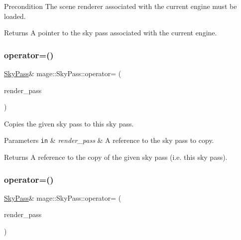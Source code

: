\begin{DoxyPrecond}{Precondition}
The scene renderer associated with the current engine must be loaded. 
\end{DoxyPrecond}
\begin{DoxyReturn}{Returns}
A pointer to the sky pass associated with the current engine. 
\end{DoxyReturn}
\hypertarget{classmage_1_1_sky_pass_acfb9531772b437603825e43d17f4d983}{}\label{classmage_1_1_sky_pass_acfb9531772b437603825e43d17f4d983} 
\subsubsection{\texorpdfstring{operator=()}{operator=()}\hspace{0.1cm}{\footnotesize\ttfamily [1/2]}}
{\footnotesize\ttfamily \hyperlink{classmage_1_1_sky_pass}{Sky\+Pass}\& mage\+::\+Sky\+Pass\+::operator= (\begin{DoxyParamCaption}\item[{const \hyperlink{classmage_1_1_sky_pass}{Sky\+Pass} \&}]{render\+\_\+pass }\end{DoxyParamCaption})\hspace{0.3cm}{\ttfamily [delete]}}

Copies the given sky pass to this sky pass.


\begin{DoxyParams}[1]{Parameters}
\mbox{\tt in}  & {\em render\+\_\+pass} & A reference to the sky pass to copy. \\
\hline
\end{DoxyParams}
\begin{DoxyReturn}{Returns}
A reference to the copy of the given sky pass (i.\+e. this sky pass). 
\end{DoxyReturn}
\hypertarget{classmage_1_1_sky_pass_ae15ed24b3bbf4008b90e4cfcb4117a84}{}\label{classmage_1_1_sky_pass_ae15ed24b3bbf4008b90e4cfcb4117a84} 
\subsubsection{\texorpdfstring{operator=()}{operator=()}\hspace{0.1cm}{\footnotesize\ttfamily [2/2]}}
{\footnotesize\ttfamily \hyperlink{classmage_1_1_sky_pass}{Sky\+Pass}\& mage\+::\+Sky\+Pass\+::operator= (\begin{DoxyParamCaption}\item[{\hyperlink{classmage_1_1_sky_pass}{Sky\+Pass} \&\&}]{render\+\_\+pass }\end{DoxyParamCaption})\hspace{0.3cm}{\ttfamily [delete]}}

